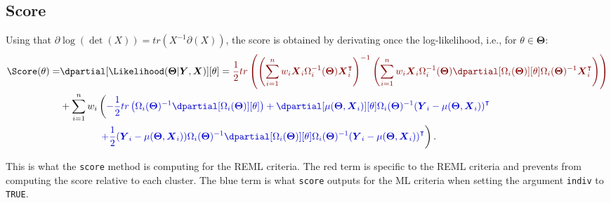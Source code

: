 \documentclass[12pt]{article}
\newcommand{\darkblue}{blue!80!black}
\newcommand{\darkred}{red!50!black}
\newcommand\trans[1]{{#1}^\intercal}%
\newcommand{\param}{\Theta}
\newcommand{\Vparam}{\boldsymbol{\param}}
\newcommand{\VX}{\boldsymbol{X}}
\newcommand{\VY}{\boldsymbol{Y}}
\begin{document}
\bigskip
\subsection{Score}
\label{sec:org0a6faab}

 Using that \(\partial \log(\det(X))=tr(X^{-1}\partial(X))\), the
score is obtained by derivating once the log-likelihood, i.e., for
\(\theta \in \Vparam\):
\begin{align*}
   \Score(\theta) =& \dpartial[\Likelihood(\Vparam|\VY,\VX)][\theta]
= \textcolor{\darkred}{ \frac{1}{2} tr \left( \left(\sum_{i=1}^n w_i \VX_i \Omega_i^{-1}(\Vparam) \trans{\VX}_i\right)^{-1} \left(\sum_{i=1}^n w_i \VX_i \Omega_i^{-1}(\Vparam) \dpartial[\Omega_i(\Vparam)][\theta] \Omega_i(\Vparam)^{-1} \trans{\VX}_i\right)  \right) } \\
&+ \sum_{i=1}^n w_i \left( \textcolor{\darkblue}{ -\frac{1}{2} tr\left(\Omega_i(\Vparam)^{-1} \dpartial[\Omega_i(\Vparam)][\theta]\right) + \dpartial[\mu(\Vparam,\VX_i)][\theta] \Omega_i(\Vparam)^{-1} \trans{(\VY_i-\mu(\Vparam,\VX_i))} } \right. \\
 & \qquad \qquad \left. \textcolor{\darkblue}{ + \frac{1}{2} (\VY_i-\mu(\Vparam,\VX_i)) \Omega_i(\Vparam)^{-1} \dpartial[\Omega_i(\Vparam)][\theta] \Omega_i(\Vparam)^{-1} \trans{(\VY_i-\mu(\Vparam,\VX_i))} } \right).
\end{align*}

This is what the \texttt{score} method is computing for the REML
criteria. The red term is specific to the REML criteria and prevents
from computing the score relative to each cluster. The blue term is
what \texttt{score} outputs for the ML criteria when setting the argument
\texttt{indiv} to \texttt{TRUE}.

\bigskip

\clearpage
\end{document}
